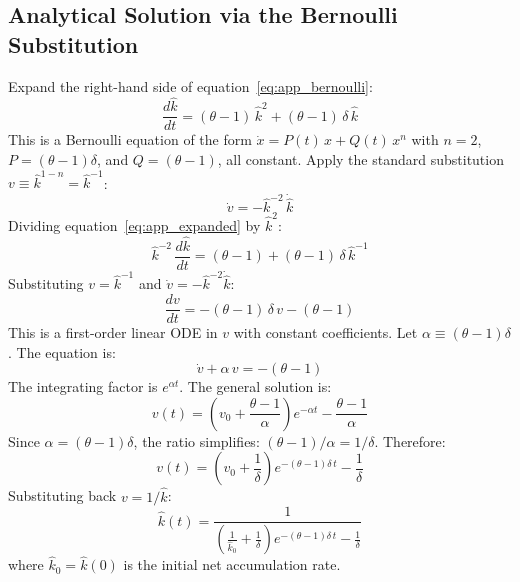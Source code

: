 \documentclass[11pt,a4paper]{article}
\begin{document}

\subsection{Analytical Solution via the Bernoulli Substitution}
\label{app:bernoulli_solution}

Expand the right-hand side of equation~\eqref{eq:app_bernoulli}:
%
\begin{equation}\label{eq:app_expanded}
	\frac{d\hat{k}}{dt} = (\theta - 1)\,\hat{k}^2 + (\theta - 1)\,\delta\,\hat{k}
\end{equation}
%
This is a Bernoulli equation of the form $\dot{x} = P(t)\,x + Q(t)\,x^n$ with $n = 2$, $P = (\theta - 1)\delta$, and $Q = (\theta - 1)$, all constant. Apply the standard substitution $v \equiv \hat{k}^{1-n} = \hat{k}^{-1}$:
%
\begin{equation}\label{eq:app_sub}
	\dot{v} = -\hat{k}^{-2}\,\dot{\hat{k}}
\end{equation}
%
Dividing equation~\eqref{eq:app_expanded} by $\hat{k}^2$:
%
\begin{equation}\label{eq:app_divided}
	\hat{k}^{-2}\,\frac{d\hat{k}}{dt} = (\theta - 1) + (\theta - 1)\,\delta\,\hat{k}^{-1}
\end{equation}
%
Substituting $v = \hat{k}^{-1}$ and $\dot{v} = -\hat{k}^{-2}\dot{\hat{k}}$:
%
\begin{equation}\label{eq:app_linear}
	\frac{dv}{dt} = -(\theta - 1)\,\delta\,v - (\theta - 1)
\end{equation}
%
This is a first-order linear ODE in $v$ with constant coefficients. Let $\alpha \equiv (\theta - 1)\delta$. The equation is:
%
\begin{equation}\label{eq:app_linear_standard}
	\dot{v} + \alpha\,v = -(\theta - 1)
\end{equation}
%
The integrating factor is $e^{\alpha t}$. The general solution is:
%
\begin{equation}\label{eq:app_v_solution}
	v(t) = \left(v_0 + \frac{\theta - 1}{\alpha}\right) e^{-\alpha t} - \frac{\theta - 1}{\alpha}
\end{equation}
%
Since $\alpha = (\theta - 1)\delta$, the ratio simplifies: $(\theta - 1)/\alpha = 1/\delta$. Therefore:
%
\begin{equation}\label{eq:app_v_simplified}
	v(t) = \left(v_0 + \frac{1}{\delta}\right) e^{-(\theta-1)\delta\,t} - \frac{1}{\delta}
\end{equation}
%
Substituting back $v = 1/\hat{k}$:
%
\begin{equation}\label{eq:app_khat_solution}
	\boxed{\hat{k}(t) = \frac{1}{\left(\frac{1}{\hat{k}_0} + \frac{1}{\delta}\right) e^{-(\theta-1)\delta\,t} - \frac{1}{\delta}}}
\end{equation}
%
where $\hat{k}_0 = \hat{k}(0)$ is the initial net accumulation rate.
\end{document}
